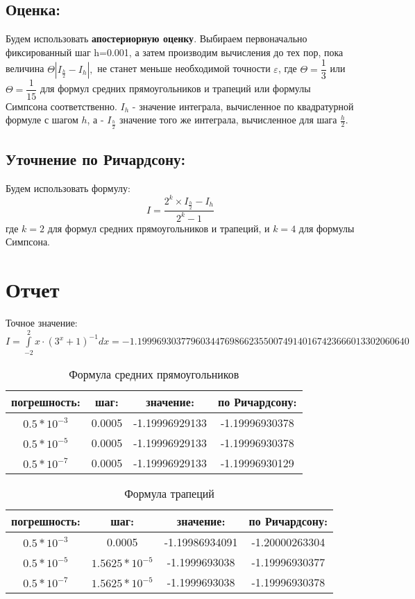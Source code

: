 \documentclass{article}
\begin{document}
\subsection{Оценка:}
Будем использовать \textbf{апостериорную оценку}.
Выбираем первоначально фиксированный шаг h=0.001, а затем производим вычисления до тех пор, пока величина $\Theta |I_{\frac{h}{2}}-I_{h}|,$ не станет меньше необходимой точности $\varepsilon$, где $\Theta = \dfrac{1}{3}$ или  $\Theta = \dfrac{1}{15}$ для формул средних прямоугольников и трапеций или формулы Симпсона соответственно. $I_h$ - значение интеграла, вычисленное по квадратурной формуле с шагом $h$, а - $I_\frac{h}{2}$ значение того же интеграла, вычисленное для шага $\frac{h}{2}$.

\subsection{Уточнение по Ричардсону:}
Будем использовать формулу:
\begin{equation}
    I = \frac{2^k \times I_{\frac{h}{2}}-I_{h}}{2^k-1}
\end{equation}
где $k=2$ для формул средних прямоугольников и трапеций, и $k=4$ для формулы Симпсона.

\section{Отчет}
Точное значение: $I = \int\limits_{-2}^{2} x \cdot (3^x + 1)^{-1} dx = -1.19996930377960344769866235500749140167423666013302060640$
\begin{table}[H]
\caption{Формула средних прямоугольников}
\label{tabular:timesandtenses}
\begin{center}
\begin{tabular}{|c|c|c|c|} \hline
погрешность: & шаг: & значение: & по Ричардсону: \\ \hline
$0.5*10^{-3}$ & 0.0005 & -1.19996929133 & -1.19996930378 \\
$0.5*10^{-5}$ & 0.0005 & -1.19996929133 & -1.19996930378 \\
$0.5*10^{-7}$ & 0.0005 & -1.19996929133 & -1.19996930129 \\ \hline
\end{tabular}
\end{center}
\end{table}

\begin{table}[H]
\caption{Формула трапеций}
\label{tabular:timesandtenses}
\begin{center}
\begin{tabular}{|c|c|c|c|} \hline
погрешность: & шаг: & значение: & по Ричардсону: \\ \hline
$0.5*10^{-3}$ & 0.0005 & -1.19986934091 & -1.20000263304 \\
$0.5*10^{-5}$ & $1.5625*10^{-5}$ & -1.1999693038 & -1.19996930377 \\
$0.5*10^{-7}$ & $1.5625*10^{-5}$ & -1.1999693038 & -1.19996930378 \\ \hline
\end{tabular}
\end{center}
\end{table}
\end{document}
